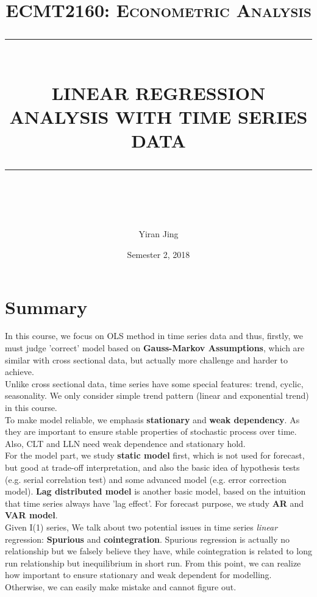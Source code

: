 \documentclass[12pt]{article}
\newcommand{\HRule}[1]{\rule{\linewidth}{#1}}
\begin{document}
\title{ \normalsize \textsc{ECMT2160: Econometric Analysis}
		\\ [2.0cm]
		\HRule{0.5pt} \\
		\LARGE \textbf{\uppercase{Linear Regression Analysis with Time Series Data}}
		\HRule{2pt} \\ [0.5cm]
		\normalsize \vspace*{5\baselineskip}}
\date{Semester 2, 2018}
\author{Yiran Jing\\}
\maketitle

\newpage
\thispagestyle{empty}
\section*{Summary}

In this course, we focus on OLS method in time series data and thus, firstly, we must judge 'correct' model based on \textbf{Gauss-Markov Assumptions}, which are similar with cross sectional data, but actually more challenge and harder to achieve. \\

\noindent
Unlike cross sectional data, time series have some special features: trend, cyclic, seasonality. We only consider simple trend pattern (linear and exponential trend) in this course. 
\\

\noindent
To make model reliable, we emphasis \textbf{stationary} and \textbf{weak dependency}. As they are important to ensure stable properties of stochastic process over time. Also, CLT and LLN need weak dependence and stationary hold.
\\

\noindent
For the model part, we study \textbf{static model} first, which is not used for forecast, but good at trade-off interpretation, and also the basic idea of hypothesis tests (e.g. serial correlation test) and some advanced model (e.g. error correction model). \textbf{Lag distributed model} is another basic model, based on the intuition that time series always have 'lag effect'. For forecast purpose, we study \textbf{AR} and \textbf{VAR model}. 
\\

\noindent
Given I(1) series, We talk about two potential issues in time series \textit{linear} regression: \textbf{Spurious} and \textbf{cointegration}. Spurious regression is actually no relationship but we falsely believe they have, while cointegration is related to long run relationship but inequilibrium in short run. From this point, we can realize how important to ensure stationary and weak dependent for modelling. Otherwise, we can easily make mistake and cannot figure out.
\\
\end{document}
